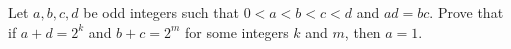 Let $a,b,c,d$ be odd integers such that $0<a<b<c<d$ and $ad=bc$. Prove that if $a+d=2^k$ and $b+c=2^m$ for some integers $k$ and $m$,  then $a=1$.